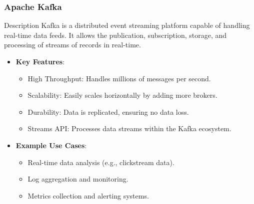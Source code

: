 \documentclass[aspectratio=169]{beamer}
\begin{document}
\begin{frame}[fragile]
    \frametitle{Apache Kafka}
    
    \begin{block}{Description}
        Kafka is a distributed event streaming platform capable of handling real-time data feeds. It allows the publication, subscription, storage, and processing of streams of records in real-time.
    \end{block}
    
    \begin{itemize}
        \item \textbf{Key Features}:
            \begin{itemize}
                \item High Throughput: Handles millions of messages per second.
                \item Scalability: Easily scales horizontally by adding more brokers.
                \item Durability: Data is replicated, ensuring no data loss.
                \item Streams API: Processes data streams within the Kafka ecosystem.
            \end{itemize}
        \item \textbf{Example Use Cases}:
            \begin{itemize}
                \item Real-time data analysis (e.g., clickstream data).
                \item Log aggregation and monitoring.
                \item Metrics collection and alerting systems.
            \end{itemize}
    \end{itemize}
\end{frame}
\end{document}
